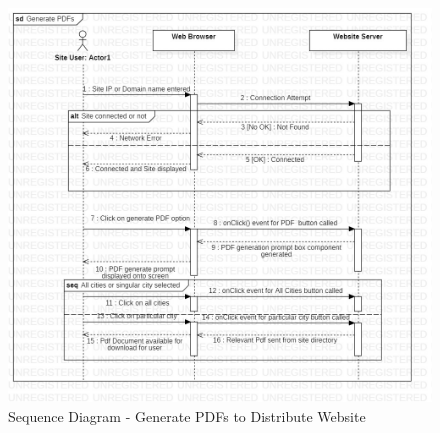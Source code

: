 \begin{figure}[H]
  \centering
  \includegraphics[width=\linewidth]{img/sequence-diagram-for-pdf.jpg}
  \caption{Sequence Diagram - Generate PDFs to Distribute Website}
\end{figure}

